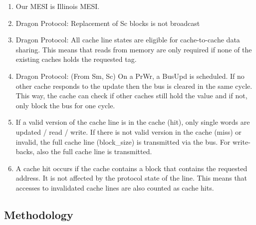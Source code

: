 \begin{enumerate}
    \item Our MESI is Illinois MESI.
    \item Dragon Protocol: Replacement of Sc blocks is not broadcast
    \item Dragon Protocol: All cache line states are eligible for cache-to-cache data sharing. This
          means that reads from memory are only required if none of the existing caches holds the requested
          tag.
    \item Dragon Protocol: (From Sm, Sc) On a PrWr, a BusUpd is scheduled. If no other cache responds to
          the update then the bus is cleared in the same cycle. This way, the cache can check if other caches
          still hold the value and if not, only block the bus for one cycle.
    \item If a valid version of the cache line is in the cache (hit), only single words are updated /
          read / write. If there is not valid version in the cache (miss) or invalid, the full cache line
          (block\_size) is transmitted via the bus. For write-backs, also the full cache line is transmitted.
    \item A cache hit occurs if the cache contains a block that contains the requested address. It is
          not affected by the protocol state of the line. This means that accesses to invalidated cache lines
          are also counted as cache hits.

\end{enumerate}
\subsection{Methodology}
